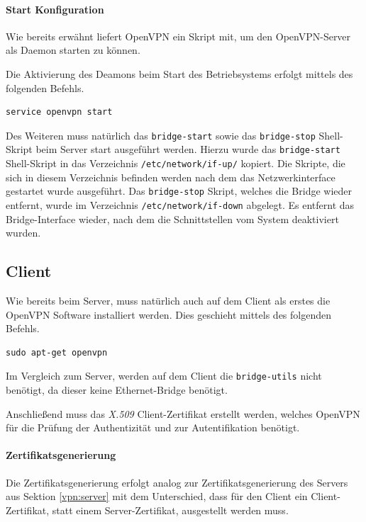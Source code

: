 \paragraph{Start Konfiguration}

Wie bereits erwähnt liefert OpenVPN ein Skript mit, um den OpenVPN-Server als Daemon starten zu können.

Die Aktivierung des Deamons beim Start des Betriebsystems erfolgt mittels des folgenden Befehls.

\begin{lstlisting}
service openvpn start
\end{lstlisting}

Des Weiteren muss natürlich das \texttt{bridge-start} sowie das \texttt{bridge-stop} Shell-Skript beim Server start ausgeführt werden. 
Hierzu wurde das \texttt{bridge-start} Shell-Skript in das Verzeichnis \texttt{/etc/network/if-up/} kopiert. Die Skripte, die sich in diesem Verzeichnis befinden werden nach dem das Netzwerkinterface gestartet wurde ausgeführt. Das \texttt{bridge-stop} Skript, welches die Bridge wieder entfernt, wurde im Verzeichnis \texttt{/etc/network/if-down} abgelegt. Es entfernt das Bridge-Interface wieder, nach dem die Schnittstellen vom System deaktiviert wurden.

\subsection{Client}

Wie bereits beim Server, muss natürlich auch auf dem Client als erstes die OpenVPN Software installiert werden. Dies geschieht mittels des folgenden Befehls.

\begin{lstlisting}
sudo apt-get openvpn
\end{lstlisting}

Im Vergleich zum Server, werden auf dem Client die \texttt{bridge-utils} nicht benötigt, da dieser keine Ethernet-Bridge benötigt.

Anschließend muss das \emph{X.509} Client-Zertifikat erstellt werden, welches OpenVPN für die Prüfung der Authentizität und zur Autentifikation benötigt.

\paragraph{Zertifikatsgenerierung}

Die Zertifikatsgenerierung erfolgt analog zur Zertifikatsgenerierung des Servers aus Sektion \ref{vpn:server} mit dem Unterschied, dass für den Client ein Client-Zertifikat, statt einem Server-Zertifikat, ausgestellt werden muss.


